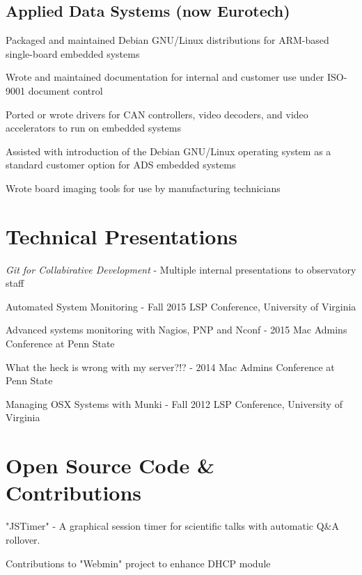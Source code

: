\documentclass[letterpaper]{deedy-resume}
\begin{document}
\begin{minipage}[t]{0.69\textwidth}
\vspace{6pt}
\subsection{Applied Data Systems (now Eurotech)}
\vspace{2pt}

\begin{tightitemize}
	\item Packaged and maintained Debian GNU/Linux distributions for ARM-based single-board embedded systems
	\item Wrote and maintained documentation for internal and customer use under ISO-9001 document control
	\item Ported or wrote drivers for CAN controllers, video decoders, and video accelerators to run on embedded systems
	\item Assisted with introduction of the Debian GNU/Linux operating system as a	standard customer option for ADS embedded systems
	\item Wrote board imaging tools for use by manufacturing technicians
\end{tightitemize}

\end{minipage}
\newpage

\section{Technical Presentations}
\begin{tightitemize}
\vspace{8pt}
\item \textit{Git for Collabirative Development} - Multiple internal presentations to observatory staff
\item Automated System Monitoring - Fall 2015 LSP Conference, University of Virginia \\
\item Advanced systems monitoring with Nagios, PNP and Nconf - 2015 Mac Admins Conference at Penn State \\
\item What the heck is wrong with my server?!? - 2014 Mac Admins Conference at Penn State \\
\item Managing OSX Systems with Munki - Fall 2012 LSP Conference, University of
Virginia \\
\end{tightitemize}

\sectionspace
\section{Open Source Code \& Contributions}
\vspace{8pt}
\begin{tightitemize}
	\item "JSTimer" - A graphical session timer for scientific talks with automatic Q\&A rollover.
	\item Contributions to "Webmin" project to enhance DHCP module
	
\end{tightitemize}
\end{document}

